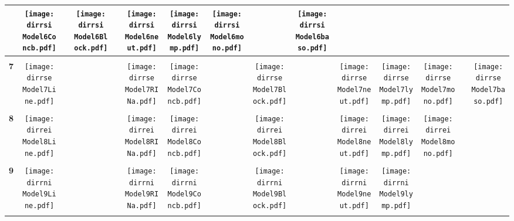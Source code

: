 \documentclass[landscape]{article}
\def \dirrsi{U:/R/RA/Data/RFI-newdata/resultpairedcbc/pvalue05/Model6.Line.RFI.Concb.RINa.neut.lymp.mono.baso.Block/}
\def \dirrse{U:/R/RA/Data/RFI-newdata/resultpairedcbc/pvalue05/Model7.Line.Concb.RINa.neut.lymp.mono.baso.Block/}
\def \dirrei{U:/R/RA/Data/RFI-newdata/resultpairedcbc/pvalue05/Model8.Line.Concb.RINa.neut.lymp.mono.Block/}
\def \dirrni{U:/R/RA/Data/RFI-newdata/resultpairedcbc/pvalue05/Model9.Line.Concb.RINa.neut.lymp.Block/}
\begin{document}
\begin{table}
\begin{tabular}{ccccccccccccccc}
      &\texttt{[image: \\dirrsi Model6Concb.pdf]}
      &
      &\texttt{[image: \\dirrsi Model6Block.pdf]}
      &
      &\texttt{[image: \\dirrsi Model6neut.pdf]}
      &\texttt{[image: \\dirrsi Model6lymp.pdf]}
      &\texttt{[image: \\dirrsi Model6mono.pdf]}
      &
      &\texttt{[image: \\dirrsi Model6baso.pdf]}
     \\
     \hline
     \\
     {\Huge \textbf{7}} 
      &\texttt{[image: \\dirrse Model7Line.pdf]}
      &
      &
      &
      &\texttt{[image: \\dirrse Model7RINa.pdf]}
      &\texttt{[image: \\dirrse Model7Concb.pdf]}
      &
      &\texttt{[image: \\dirrse Model7Block.pdf]}
      &
      &\texttt{[image: \\dirrse Model7neut.pdf]}
      &\texttt{[image: \\dirrse Model7lymp.pdf]}
      &\texttt{[image: \\dirrse Model7mono.pdf]}
      &
      &\texttt{[image: \\dirrse Model7baso.pdf]}
     \\
     \hline
     \\

     {\Huge \textbf{8}} 
      &\texttt{[image: \\dirrei Model8Line.pdf]}
      &
      &
      &
      &\texttt{[image: \\dirrei Model8RINa.pdf]}
      &\texttt{[image: \\dirrei Model8Concb.pdf]}
      &
      &\texttt{[image: \\dirrei Model8Block.pdf]}
      &
      &\texttt{[image: \\dirrei Model8neut.pdf]}
      &\texttt{[image: \\dirrei Model8lymp.pdf]}
      &\texttt{[image: \\dirrei Model8mono.pdf]}
      &
      &
     \\
     \hline
     \\
     
     {\Huge \textbf{9}} 
      &\texttt{[image: \\dirrni Model9Line.pdf]}
      &
      &
      &
      &\texttt{[image: \\dirrni Model9RINa.pdf]}
      &\texttt{[image: \\dirrni Model9Concb.pdf]}
      &
      &\texttt{[image: \\dirrni Model9Block.pdf]}
      &
      &\texttt{[image: \\dirrni Model9neut.pdf]}
      &\texttt{[image: \\dirrni Model9lymp.pdf]}
      &
      &
      &
     \\
     \hline
     \\
     
\end{tabular}
\end{table}
\end{document}
